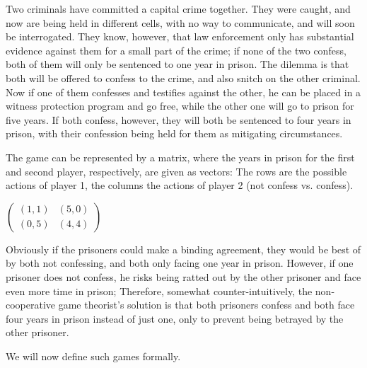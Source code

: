 \documentclass[a4paper]{scrreprt}
\begin{document}
    \begin{ex}
        Two criminals have committed a capital crime together. They were caught, and now are being held in different cells, with no way to communicate, and will soon be interrogated.
        They know, however, that law enforcement only has substantial evidence against them for a small part of the crime; if none of the two confess, both of them will only be sentenced to one year in prison.
        The dilemma is that both will be offered to confess to the crime, and also snitch on the other criminal. Now if one of them confesses and testifies against the other, he can be placed in a witness protection program and go free, while the other one will go to prison for five years. If both confess, however, they will both be sentenced to four years in prison, with their confession being held for them as mitigating circumstances.
        
        The game can be represented by a matrix, where the years in prison for the first and second player, respectively, are given as vectors:
        The rows are the possible actions of player 1, the columns the actions of player 2 (not confess vs. confess).
        
        \begin{table}[h]
            \centering
            $\begin{pmatrix}
                (1, 1) & (5, 0) \\
                (0, 5) & (4, 4)
            \end{pmatrix}$
        \end{table}
    
        Obviously if the prisoners could make a binding agreement, they would be best of by both not confessing, and both only facing one year in prison.
        However, if one prisoner does not confess, he risks being ratted out by the other prisoner and face even more time in prison; 
        Therefore, somewhat counter-intuitively, the non-cooperative game theorist's solution is that both prisoners confess and both face four years in prison instead of just one, only to prevent being betrayed by the other prisoner.
        \label{ex:prisonersDilemma}
        \label{ex:gameTheoryIntroductoryExample}
    \end{ex}

    We will now define such games formally.
\end{document}
